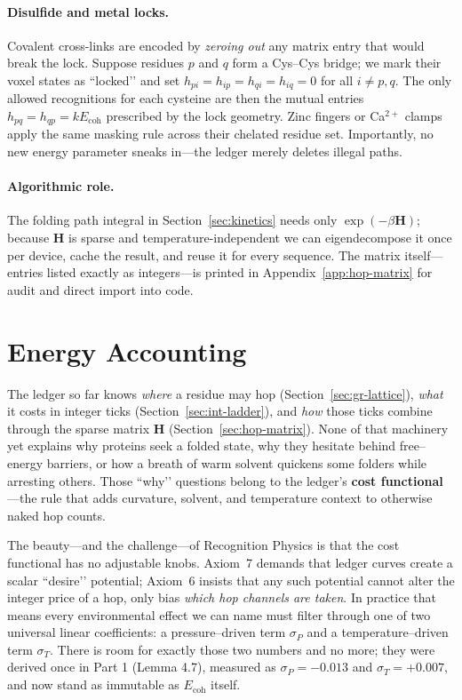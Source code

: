 \documentclass[11pt]{article}
\newcommand{\Eoh}{E_{\mathrm{coh}}}          %
\begin{document}
\paragraph{Disulfide and metal locks.}
Covalent cross-links are encoded by \emph{zeroing out} any matrix entry
that would break the lock.  Suppose residues \(p\) and \(q\) form a
Cys–Cys bridge; we mark their voxel states as ``locked’’ and set
\(h_{pi}=h_{ip}=h_{qi}=h_{iq}=0\) for all \(i\neq p,q\).  The only
allowed recognitions for each cysteine are then the mutual entries
\(h_{pq}=h_{qp}=k\Eoh\) prescribed by the lock geometry.  Zinc fingers
or Ca\(^{2+}\) clamps apply the same masking rule across their chelated
residue set.  Importantly, no new energy parameter sneaks in—the ledger
merely deletes illegal paths.

\paragraph{Algorithmic role.}
The folding path integral in Section~\ref{sec:kinetics} needs only
\(\exp(-\beta\mathbf H)\); because \(\mathbf H\) is sparse and
temperature-independent we can eigendecompose it once per device, cache
the result, and reuse it for every sequence.  The matrix itself—entries
listed exactly as integers—is printed in
Appendix~\ref{app:hop-matrix} for audit and direct import into code.

\section{Energy Accounting}\label{sec:energy}

The ledger so far knows \emph{where} a residue may hop
(Section~\ref{sec:gr-lattice}), \emph{what} it costs in integer ticks
(Section~\ref{sec:int-ladder}), and \emph{how} those ticks combine
through the sparse matrix $\mathbf H$
(Section~\ref{sec:hop-matrix}).  
None of that machinery yet explains why proteins seek a folded state,
why they hesitate behind free–energy barriers, or how a breath of warm
solvent quickens some folders while arresting others.  Those “why’’
questions belong to the ledger’s \textbf{cost functional}—the rule that
adds curvature, solvent, and temperature context to otherwise naked hop
counts.

The beauty—and the challenge—of Recognition Physics is that the cost
functional has no adjustable knobs.  Axiom~7 demands that ledger curves
create a scalar “desire’’ potential; Axiom~6 insists that any such
potential cannot alter the integer price of a hop, only bias \emph{which
hop channels are taken}.  In practice that means every environmental
effect we can name must filter through one of two universal linear
coefficients: a pressure–driven term $\sigma_{P}$ and a
temperature–driven term $\sigma_{T}$.  There is room for exactly those
two numbers and no more; they were derived once in Part 1 (Lemma 4.7),
measured as
$\sigma_{P}=-0.013$ and $\sigma_{T}=+0.007$, and now stand as immutable
as $\Eoh$ itself.
\end{document}
